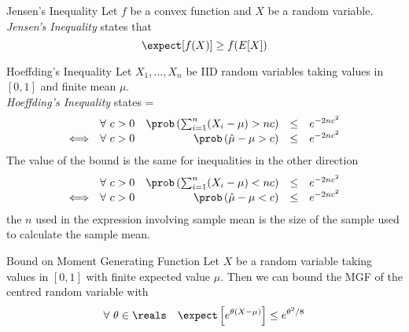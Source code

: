 \documentclass[11pt,a4paper]{article}
\begin{document}
  \begin{theorem}{Jensen's Inequality}
    Let $f$ be a convex function and $X$ be a random variable.\\
    \textit{Jensen's Inequality} states that
    \[ \expect[f(X)]\geq f(E[X]) \]
  \end{theorem}

  \begin{theorem}{Hoeffding's Inequality}
    Let $X_1,\dots,X_n$ be IID random variables taking values in $[0,1]$ and finite mean $\mu$.\\
    \textit{Hoeffding's Inequality} states
    \everymath={\displaystyle}
    \[\begin{array}{rlrcl}
      &\forall\ c>0&\prob\left(\sum_{i=1}^n(X_i-\mu)>nc\right)&\leq& e^{-2nc^2}\\
      \Longleftrightarrow&\forall\ c>0&\prob\left(\hat\mu-\mu>c\right)&\leq&e^{-2nc^2}
    \end{array}\]
    The value of the bound is the same for inequalities in the other direction
    \[\begin{array}{rlrcl}
      &\forall\ c>0&\prob\left(\sum_{i=1}^n(X_i-\mu)<nc\right)&\leq& e^{-2nc^2}\\
      \Longleftrightarrow&\forall\ c>0&\prob\left(\hat\mu-\mu<c\right)&\leq&e^{-2nc^2}
    \end{array}\]
    the $n$ used in the expression involving sample mean is the size of the sample used to calculate the sample mean.
  \end{theorem}

  \begin{theorem}{Bound on Moment Generating Function}
    Let $X$ be a random variable taking values in $[0,1]$ with finite expected value $\mu$. Then we can bound the MGF of the centred random variable with
    \[ \forall\ \theta\in\reals\quad\expect\left[e^{\theta(X-\mu)}\right]\leq e^{\theta^2/8} \]
  \end{theorem}
\end{document}
